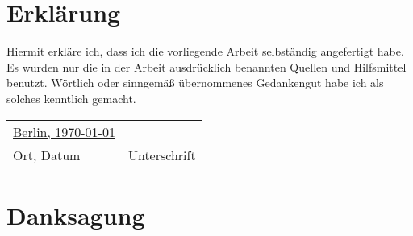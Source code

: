 

\renewcommand{\thesection}{\Roman{section}} \renewcommand{\theHsection}{\Roman{section}}


\maketitle


\vspace*{1em}
\section*{Erklärung}

Hiermit erkläre ich, dass ich die vorliegende Arbeit selbständig angefertigt habe. Es wurden nur die in der Arbeit ausdrücklich benannten Quellen und Hilfsmittel benutzt. Wörtlich oder sinngemäß übernommenes Gedankengut habe ich als solches kenntlich gemacht.\par
\vspace*{2em}
\begin{table}[ht]
	\centering
	\begin{tabular}{ p{6cm} c }
		\underline{Berlin, \today} & \underline{\hspace{5cm}}\\
		Ort, Datum & Unterschrift\\
	\end{tabular}
\end{table}

\pagebreak


\vspace*{1em}
\section*{Danksagung}

